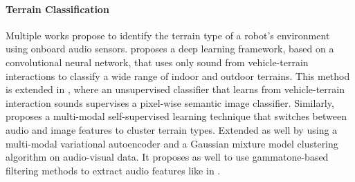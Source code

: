 
\paragraph{Terrain Classification} \label{para:terrain-classification} Multiple
works propose to identify the terrain type of a robot's environment using
onboard audio sensors. \cite{Valada2018} proposes a deep learning framework,
based on a convolutional neural network, that uses only sound from
vehicle-terrain interactions to classify a wide range of indoor and outdoor
terrains. This method is extended in \cite{DeepTerrain}, where an unsupervised
classifier that learns from vehicle-terrain interaction sounds supervises a
pixel-wise semantic image classifier. Similarly, \cite{Kurobe2021} proposes a
multi-modal self-supervised learning technique that switches between audio and
image features to cluster terrain types. Extended as well by
\cite{Ishikawa2021} using a multi-modal variational autoencoder and a Gaussian
mixture model clustering algorithm on audio-visual data. It proposes as well to
use gammatone-based filtering methods to extract audio features like in
\cite{marchegiani2018a}.
